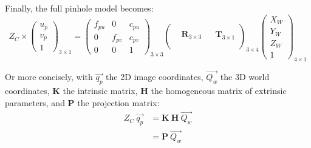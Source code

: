 Finally, the full pinhole model becomes:%
\begin{equation}\label{eq:pinhole}
  \boxed{
  Z_C \times \begin{pmatrix}u_p\\v_p\\1\end{pmatrix}_{\!\!3\times 1} 
  = \begin{pmatrix}f_{pu} & 0 & c_{pu}\\ 0 & f_{pv} & c_{pv} \\ 0&0&1\end{pmatrix}_{\!\!3\times 3}
    \begin{pmatrix} \\ & \textbf{R}_{3\times 3} &  & \textbf{T}_{3\times 1} \\  \\\end{pmatrix}_{\!\!3\times 4} 
    \begin{pmatrix}X_W\\Y_W\\Z_W\\1\end{pmatrix}_{\!\!4\times1}
  }
\end{equation}

Or more concisely, with $\overrightarrow{q_p}$ the 2D image coordinates, $\overrightarrow{Q_w}$ the 3D world coordinates, $\textbf{K}$ the intrinsic matrix, $\textbf{H}$ the homogeneous matrix of extrinsic parameters, and $\textbf{P}$ the projection matrix:
\begin{equation}\label{eq:pinhole_short}
  \boxed{
  \begin{aligned}
  Z_C \ \overrightarrow{q_p} &= \textbf{K} \ \textbf{H} \ \overrightarrow{Q_w}\\
  &= \textbf{P} \ \overrightarrow{Q_w}
  \end{aligned}
  }
\end{equation}

